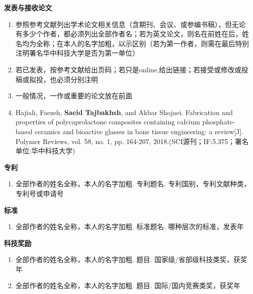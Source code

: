 \begin{publications}
\noindent
\textbf{发表与接收论文}
\renewcommand{\labelenumi}{[\arabic{enumi}]}
\begin{enumerate}
    \item 参照参考文献列出学术论文相关信息（含期刊、会议、或参编书稿），但无论有多少个作者，都必须列出全部作者名；若为英文论文，则名在前姓在后，姓名均为全称；在本人的名字加粗，以示区别（若为第一作者，则需在最后特别注明署名华中科技大学是否为第一单位）
    \item 若已发表，按参考文献给出页码；若只是online,给出链接；若接受或修改或投稿或拟投，也必须分别注明
    \item 一般情况，一作或重要的论文放在前面
    \item Hajiali, Faezeh, \textbf{Saeid Tajbakhsh}, and Akbar Shojaei. Fabrication and properties of polycaprolactone composites containing calcium phosphate-based ceramics and bioactive glasses in bone tissue engineering: a review[J]. Polymer Reviews, vol. 58, no. 1, pp. 164-207, 2018.(SCI源刊；IF:5.375；署名单位:华中科技大学)
\end{enumerate}
\vspace{2em}
\textbf{专\hspace{2em}利}
\renewcommand{\labelenumi}{[\arabic{enumi}]}
\begin{enumerate}
    \item 全部作者的姓名全称，本人的名字加粗. 专利题名. 专利国别，专利文献种类，专利号或申请号
\end{enumerate}
\vspace{2em}
\textbf{标\hspace{2em}准}
\renewcommand{\labelenumi}{[\arabic{enumi}]}
\begin{enumerate}
    \item 全部作者的姓名全称，本人的名字加粗. 标准题名. 哪种层次的标准，发表年
\end{enumerate}
\vspace{2em}
\textbf{科技奖励}
\renewcommand{\labelenumi}{[\arabic{enumi}]}
\begin{enumerate}
    \item 全部作者的姓名全称，本人的名字加粗. 题目. 国家级/省部级科技类奖，获奖年
    \item 全部作者的姓名全称，本人的名字加粗. 题目. 国际/国内竞赛类奖，获奖年
\end{enumerate}
\end{publications}
